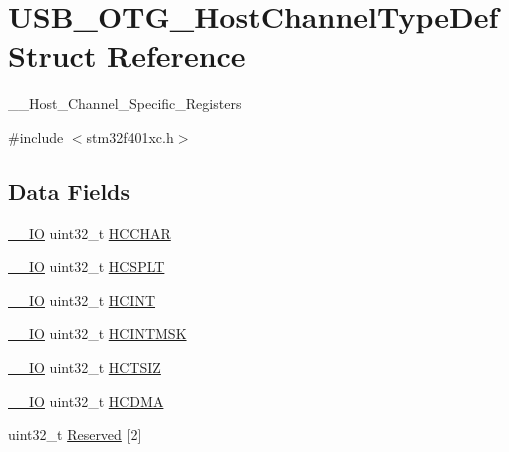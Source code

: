 \hypertarget{struct_u_s_b___o_t_g___host_channel_type_def}{}\section{U\+S\+B\+\_\+\+O\+T\+G\+\_\+\+Host\+Channel\+Type\+Def Struct Reference}
\label{struct_u_s_b___o_t_g___host_channel_type_def}


\+\_\+\+\_\+\+Host\+\_\+\+Channel\+\_\+\+Specific\+\_\+\+Registers  




{\ttfamily \#include $<$stm32f401xc.\+h$>$}

\subsection*{Data Fields}
\begin{DoxyCompactItemize}
\item 
\hyperlink{core__sc300_8h_aec43007d9998a0a0e01faede4133d6be}{\+\_\+\+\_\+\+IO} uint32\+\_\+t \hyperlink{struct_u_s_b___o_t_g___host_channel_type_def_ac1d0619a44758dcaeeda5c0b9c22f784}{H\+C\+C\+H\+AR}
\item 
\hyperlink{core__sc300_8h_aec43007d9998a0a0e01faede4133d6be}{\+\_\+\+\_\+\+IO} uint32\+\_\+t \hyperlink{struct_u_s_b___o_t_g___host_channel_type_def_ad715951248900b9a7c8c9ddb688bb3a0}{H\+C\+S\+P\+LT}
\item 
\hyperlink{core__sc300_8h_aec43007d9998a0a0e01faede4133d6be}{\+\_\+\+\_\+\+IO} uint32\+\_\+t \hyperlink{struct_u_s_b___o_t_g___host_channel_type_def_a830a2b58d0eb53a7ec8f9816103e3bc1}{H\+C\+I\+NT}
\item 
\hyperlink{core__sc300_8h_aec43007d9998a0a0e01faede4133d6be}{\+\_\+\+\_\+\+IO} uint32\+\_\+t \hyperlink{struct_u_s_b___o_t_g___host_channel_type_def_ae69520f078c84fb1d33cd7551ff23342}{H\+C\+I\+N\+T\+M\+SK}
\item 
\hyperlink{core__sc300_8h_aec43007d9998a0a0e01faede4133d6be}{\+\_\+\+\_\+\+IO} uint32\+\_\+t \hyperlink{struct_u_s_b___o_t_g___host_channel_type_def_adde42c516172a887c570545d965200cf}{H\+C\+T\+S\+IZ}
\item 
\hyperlink{core__sc300_8h_aec43007d9998a0a0e01faede4133d6be}{\+\_\+\+\_\+\+IO} uint32\+\_\+t \hyperlink{struct_u_s_b___o_t_g___host_channel_type_def_af294702e1d54fe06b43e7a3b4033dc2e}{H\+C\+D\+MA}
\item 
uint32\+\_\+t \hyperlink{struct_u_s_b___o_t_g___host_channel_type_def_afa710a7c5f28fe6dcb59d7b89112b0d0}{Reserved} \mbox{[}2\mbox{]}
\end{DoxyCompactItemize}


